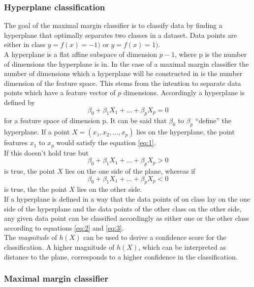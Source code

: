 \subsubsection*{Hyperplane classification}
The goal of the maximal margin classifier is to classify data by finding a hyperplane that optimally separates two classes in a dataset. Data points are either in class $y=f(x)=-1)$ or $y=f(x)=1)$. 
\\
A hyperplane is a flat affine subspace of dimension $p-1$, where p is the number of dimensions the hyperplane is in. In the case of a maximal margin classifier the number of dimensions which a hyperplane will be constructed in is the number dimension of the feature space. This stems from the intention to separate data points which have a feature vector of $p$ dimensions. Accordingly a hyperplane is defined by
\begin{equation} \label{eq:1}
\beta_0 + \beta_1 X_1 + ... + \beta_p X_p = 0
\end{equation}
for a feature space of dimension p. It can be said that $\beta_0$  to $\beta_p$ ``define'' the hyperplane.
If a point $X=(x_1,x_2,...,x_p)$ lies on the hyperplane, the point features $x_1$ to $x_p$ would satisfy the equation \ref{eq:1}.
\\
If this doesn't hold true but
\begin{equation} \label{eq:2}
\beta _0 + \beta _1 X_1 + ... + \beta_p X_p > 0
\end{equation}
is true, the point $X$ lies on the one side of the plane, whereas if 
\begin{equation} \label{eq:3}
\beta_0 + \beta_1 X_1 + ... + \beta_p X_p < 0
\end{equation}
is true, the the point $X$ lies on the other side. 
\\
If a hyperplane is defined in a way that the data points of on class lay on the one side of the hyperplane and the data points of the other class on the other side, any given data point can be classified accordingly as either one or the other class according to equations \ref{eq:2} and \ref{eq:3}.
\\
The \emph{magnitude} of $h(X)$ can be used to derive a confidence score for the classification. A higher magnitude of $h(X)$, which can be interpreted as distance to the plane, corresponds to a higher confidence in the classification.


\subsubsection*{Maximal margin classifier}

